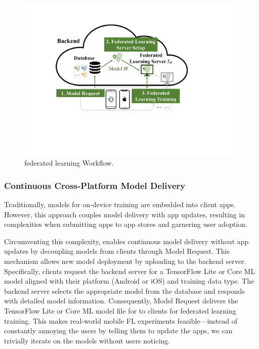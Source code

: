 \begin{figure}\begin{center}
    \includegraphics[width=0.7\linewidth]{fl_workflow.pdf}
    \caption{\fedkit federated learning Workflow.}
    \label{fig:fl-workflow}
\end{center}\end{figure}

\subsubsection{Continuous Cross-Platform Model Delivery}
Traditionally, models for on-device training are embedded into client apps.
However, this approach couples model delivery with app updates,
resulting in complexities when submitting apps to app stores and garnering user
adoption.

Circumventing this complexity,
\fedkit enables continuous model delivery without app updates by decoupling
models from clients through Model Request. This mechanism allows new model
deployment by uploading to the backend server. Specifically,
clients request the backend server for a TensorFlow Lite or Core ML model
aligned with their platform (Android or iOS) and training data type.
The backend server selects the appropriate model \model{}
from the database and responds with detailed model information. Consequently,
Model Request delivers the TensorFlow Lite or Core ML model file for \model{}
to clients for federated learning training.
This makes real-world mobile FL experiments feasible---instead of constantly
annoying the users by telling them to update the apps,
we can trivially iterate on the models without users noticing.

